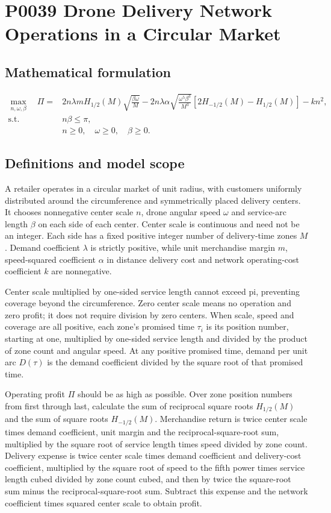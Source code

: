 \documentclass[10pt]{article}
\begin{document}
\section*{P0039 Drone Delivery Network Operations in a Circular Market}
\subsection*{Mathematical formulation}
\begin{align}
\max_{n,\omega,\beta}\quad
\Pi={}&2n\lambda mH_{1/2}(M)\sqrt{\frac{\beta\omega}{M}}
-2n\lambda\alpha\sqrt{\frac{\omega^5\beta^3}{M^3}}
\left[2H_{-1/2}(M)-H_{1/2}(M)\right]-kn^2,\tag{$P^M$}\\
\text{s.t.}\quad &n\beta\le\pi,\\
&n\ge0,\quad\omega\ge0,\quad\beta\ge0.
\end{align}

\subsection*{Definitions and model scope}
A retailer operates in a circular market of unit radius, with customers uniformly distributed around the circumference and symmetrically placed delivery centers. It chooses nonnegative center scale $n$, drone angular speed $\omega$ and service-arc length $\beta$ on each side of each center. Center scale is continuous and need not be an integer. Each side has a fixed positive integer number of delivery-time zones $M$. Demand coefficient $\lambda$ is strictly positive, while unit merchandise margin $m$, speed-squared coefficient $\alpha$ in distance delivery cost and network operating-cost coefficient $k$ are nonnegative.

Center scale multiplied by one-sided service length cannot exceed pi, preventing coverage beyond the circumference. Zero center scale means no operation and zero profit; it does not require division by zero centers. When scale, speed and coverage are all positive, each zone's promised time $\tau_i$ is its position number, starting at one, multiplied by one-sided service length and divided by the product of zone count and angular speed. At any positive promised time, demand per unit arc $D(\tau)$ is the demand coefficient divided by the square root of that promised time.

Operating profit $\Pi$ should be as high as possible. Over zone position numbers from first through last, calculate the sum of reciprocal square roots $H_{1/2}(M)$ and the sum of square roots $H_{-1/2}(M)$. Merchandise return is twice center scale times demand coefficient, unit margin and the reciprocal-square-root sum, multiplied by the square root of service length times speed divided by zone count. Delivery expense is twice center scale times demand coefficient and delivery-cost coefficient, multiplied by the square root of speed to the fifth power times service length cubed divided by zone count cubed, and then by twice the square-root sum minus the reciprocal-square-root sum. Subtract this expense and the network coefficient times squared center scale to obtain profit.
\end{document}
